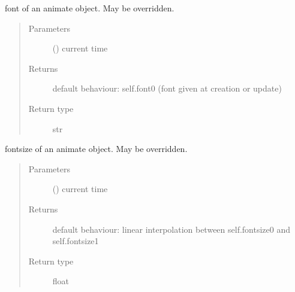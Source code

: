 \documentclass[letterpaper,10pt,english]{sphinxmanual}
\begin{document}
\begin{fulllineitems}
\begin{fulllineitems}
\end{fulllineitems}


\begin{fulllineitems}
\label{\detokenize{Reference:salabim.Animate.font}}
font of an animate object. May be overridden.
\begin{quote}\begin{description}
\item[{Parameters}] \leavevmode
{} () \textendash{} current time

\item[{Returns}] \leavevmode
{} \textendash{} default behaviour: self.font0 (font given at creation or update)

\item[{Return type}] \leavevmode
str

\end{description}\end{quote}

\end{fulllineitems}


\begin{fulllineitems}
\label{\detokenize{Reference:salabim.Animate.fontsize}}
fontsize of an animate object. May be overridden.
\begin{quote}\begin{description}
\item[{Parameters}] \leavevmode
{} () \textendash{} current time

\item[{Returns}] \leavevmode
{} \textendash{} default behaviour: linear interpolation between self.fontsize0 and self.fontsize1

\item[{Return type}] \leavevmode
float

\end{description}\end{quote}

\end{fulllineitems}



\end{fulllineitems}
\end{document}

